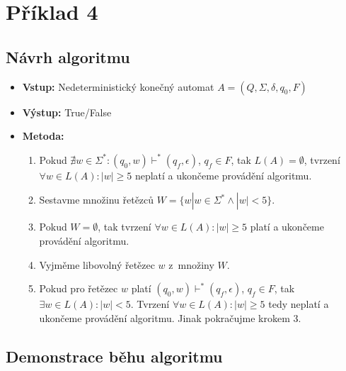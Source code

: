 \documentclass[11pt, a4paper, titlepage]{article}
\begin{document}
\newpage


\section*{Příklad 4}

\subsection*{Návrh algoritmu}

\begin{itemize}

    \item \textbf{Vstup:} Nedeterministický konečný automat $A=(Q, \Sigma, \delta, q_0, F)$
    \item \textbf{Výstup:} True/False
    \item \textbf{Metoda:} \begin{enumerate}

        \item Pokud $\nexists w \in \Sigma^* : (q_0, w) \vdash^* (q_f, \epsilon)$, $q_f \in F$, tak $L(A)=\emptyset$, tvrzení $\forall w \in L(A) : |w| \ge 5$ neplatí a ukončeme provádění algoritmu.

        \item Sestavme množinu řetězců $W=\{w | w \in \Sigma^* \land |w| < 5\}$.

        \item Pokud $W=\emptyset$, tak tvrzení $\forall w \in L(A) : |w| \ge 5$ platí a ukončeme provádění algoritmu.

        \item Vyjměme libovolný řetězec $w$ z~množiny $W$.

        \item Pokud pro řetězec $w$ platí $(q_0, w) \vdash^* (q_f, \epsilon)$, $q_f \in F$, tak $\exists w \in L(A) : |w|<5$. Tvrzení $\forall w \in L(A) : |w| \ge 5$ tedy neplatí a ukončeme provádění algoritmu. Jinak pokračujme krokem 3.

    \end{enumerate}

\end{itemize}

\subsection*{Demonstrace běhu algoritmu}
\end{document}
